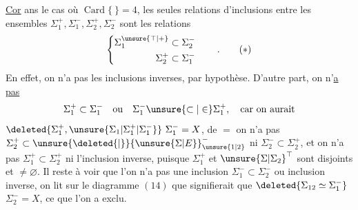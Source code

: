 \begingroup\makeatletter\tagsleft@true\makeatother
\uline{Cor} ans le cas où $\operatorname{Card}\{\ \}=4$,  les seules relations d'inclusions entre les ensembles $\Sigma_1^+,\Sigma_1^-,\Sigma_2^+,\Sigma_2^-$ sont les relations
\[
\left\{\begin{aligned}
\Sigma_1^{\unsure{\top|+}}&\subset\Sigma_2^-\\
\Sigma_2^+&\subset\Sigma_1^-
\end{aligned}\right.\qquad .
\tag*{($*$)}
\]
En effet, on n'a pas les inclusions inverses, par hypothèse. D'autre part, on n'\uline{a pas}
\[
\Sigma_1^+\subset\Sigma_1^-\quad\text{ou}\quad
\Sigma_1^-\unsure{\subset|\in}\Sigma_1^+,\quad\text{car on aurait}
\]
$\deleted{\Sigma_1^+,\unsure{\Sigma_1|\Sigma_1^+|\Sigma_1^-}}\ \Sigma_1^-=X$, de $=$ on n'a pas $\Sigma_2^+\subset\unsure{\deleted{\vert}}{\unsure{\Sigma|E}}_{\unsure{1|2}}^-$ ni $\Sigma_2^-\subset\Sigma_2^+$, et on n'a pas $\Sigma_1^+\subset\Sigma_2^+$ ni l'inclusion inverse, puisque $\Sigma_1^+$ et $\unsure{\Sigma|\Sigma_2}^{\top}$ sont disjoints et $\ne\varnothing$. Il reste à voir que l'on n'a pas une inclusion $\Sigma_1^-\subset\Sigma_2^-$ ou inclusion inverse, on lit sur le diagramme $(14)$ que   signifierait que $\deleted{\Sigma_{12}\simeq\Sigma_1^-}$  $\Sigma_2^-=X$, ce que l'on a exclu.

